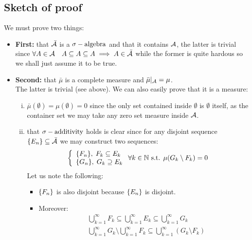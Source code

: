 \subsection*{Sketch of proof}
We  must prove two things:
\begin{itemize}
    \item \textbf{First:} that $\bar{\mathcal{A}}$ is a $\sigma-\text{algebra}$ and that it contains $\mathcal{A}$, the latter is trivial since $\forall A\in\mathcal{A} \quad A\subseteq A\subseteq A \implies A\in\bar{\mathcal{A}}$ while the former is quite hardous so we shall just assume it to be true.
    \item \textbf{Second:} that $\bar{\mu}$ is a complete measure and $\bar{\mu}|_{\mathcal{A}}=\mu$.\\
          The latter is trivial (see above). We can also easily prove that it is a measure:
          \begin{enumerate}[i)]
              \item $\bar{\mu}(\emptyset)=\mu(\emptyset)=0$ since the only set contained inside $\emptyset$ is $\emptyset$ itself, as the container set we may take any zero set measure inside $\mathcal{A}$.
              \item that $\sigma-\text{additivity}$ holds is clear since for any disjoint sequence $\{ E_n \}\subseteq\bar{\mathcal{A}}$ we may construct two sequences:
                    \[
                        \left\{ \begin{array}{l}
                            \{ F_n \}, \; F_k \subseteq E_k \\
                            \{ G_n \}, \; G_k \supseteq E_k
                        \end{array} \right. \forall k\in\mathbb{N} \text{ s.t. } \mu(G_k\setminus F_k) = 0
                    \]
                    Let us note the following:
                    \begin{itemize}
                        \item $\{ F_n \}$ is also disjoint because $\{ E_n \}$ is disjoint.
                        \item Moreover:
                              \begin{align*}
                                   & \bigcup_{k=1}^{\infty} F_k \subseteq \bigcup_{k=1}^{\infty} E_k \subseteq \bigcup_{k=1}^{\infty} G_k                                                                                                 \\
                                   & \bigcup_{k=1}^{\infty} G_k \setminus \bigcup_{k=1}^{\infty} F_k \subseteq \bigcup_{k=1}^{\infty} (G_k \setminus F_k )                                                                                \\

\end{align*}
\end{itemize}
\end{enumerate}
\end{itemize}
